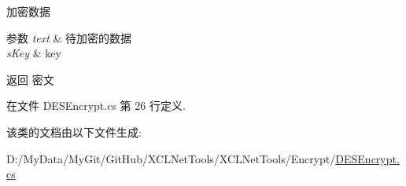 加密数据 


\begin{DoxyParams}{参数}
{\em text} & 待加密的数据\\
\hline
{\em s\-Key} & key\\
\hline
\end{DoxyParams}
\begin{DoxyReturn}{返回}
密文
\end{DoxyReturn}


在文件 D\-E\-S\-Encrypt.\-cs 第 26 行定义.



该类的文档由以下文件生成\-:\begin{DoxyCompactItemize}
\item 
D\-:/\-My\-Data/\-My\-Git/\-Git\-Hub/\-X\-C\-L\-Net\-Tools/\-X\-C\-L\-Net\-Tools/\-Encrypt/\hyperlink{_d_e_s_encrypt_8cs}{D\-E\-S\-Encrypt.\-cs}\end{DoxyCompactItemize}
